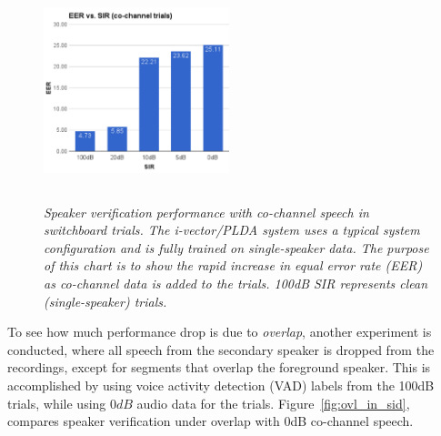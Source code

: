 \begin{figure}[h!]
	\vspace{-1mm}
	\centering
	\includegraphics[height = 2.5in, width=0.48\textwidth]{chapters/cochannelplda_jp/IEEEtran/figures/eer_vs_sir_swb2_baseline}
	\vspace{-2mm}
	\caption{\it \small Speaker verification performance with co-channel speech in switchboard trials. The i-vector/PLDA system uses a typical system configuration and is fully trained on single-speaker data. The purpose of this chart is to show the rapid increase in equal error rate (EER) as co-channel data is added to the trials. 100dB SIR represents clean (single-speaker) trials.}
	\label{fig:cch_in_sid}
	\vspace{-1mm}
\end{figure}

To see how much performance drop is due to {\it overlap}, another experiment is conducted, where all speech from the secondary speaker is dropped from the recordings, except for segments that overlap the foreground speaker. 
This is accomplished by using voice activity detection (VAD) labels from the 100dB trials, while using $0dB$ audio data for the trials. 
Figure~\ref{fig:ovl_in_sid}, compares speaker verification under overlap with 0dB co-channel speech. 

